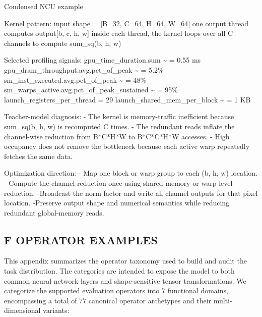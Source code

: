 \documentclass[
  10
]{article}
\newenvironment{Shaded}{}{}
\newcommand{\NormalTok}[1]{#1}
\begin{document}
\begin{Shaded}
\begin{Highlighting}[]
\NormalTok{Condensed NCU example}

\NormalTok{Kernel pattern:}
\NormalTok{    input shape = [B=32, C=64, H=64, W=64]}
\NormalTok{    one output thread computes output[b, c, h, w]}
\NormalTok{    inside each thread, the kernel loops over all C channels to compute sum\_sq(b, h, w)}

\NormalTok{Selected profiling signals:}
\NormalTok{    gpu\_time\_duration.sum \textasciitilde{} = 0.55 ms}
\NormalTok{    gpu\_dram\_throughput.avg.pct\_of\_peak \textasciitilde{} = 5.2\%}
\NormalTok{    sm\_inst\_executed.avg.pct\_of\_peak \textasciitilde{} = 48\%}
\NormalTok{    sm\_warps\_active.avg.pct\_of\_peak\_sustained \textasciitilde{} = 95\%}
\NormalTok{    launch\_registers\_per\_thread = 29}
\NormalTok{    launch\_shared\_mem\_per\_block \textasciitilde{} = 1 KB}

\NormalTok{Teacher{-}model diagnosis:}
\NormalTok{    {-} The kernel is memory{-}traffic inefficient because sum\_sq(b, h, w) is recomputed C times.}
\NormalTok{    {-} The redundant reads inflate the channel{-}wise reduction from B*C*H*W to B*C*C*H*W accesses.}
\NormalTok{    {-} High occupancy does not remove the bottleneck because each active warp repeatedly fetches the same data.}

\NormalTok{Optimization direction:}
\NormalTok{    {-} Map one block or warp group to each (b, h, w) location.}
\NormalTok{    {-} Compute the channel reduction once using shared memory or warp{-}level reduction.}
\NormalTok{    {-}Broadcast the norm factor and write all channel outputs for that pixel location.}
\NormalTok{    {-}Preserve output shape and numerical semantics while reducing redundant global{-}memory reads. }
\end{Highlighting}
\end{Shaded}

\subsection{F OPERATOR EXAMPLES}\label{f-operator-examples}

This appendix summarizes the operator taxonomy used to build and audit
the task distribution. The categories are intended to expose the model
to both common neural-network layers and shape-sensitive tensor
transformations. We categorize the supported evaluation operators into 7
functional domains, encompassing a total of 77 canonical operator
archetypes and their multi-dimensional variants:
\end{document}
